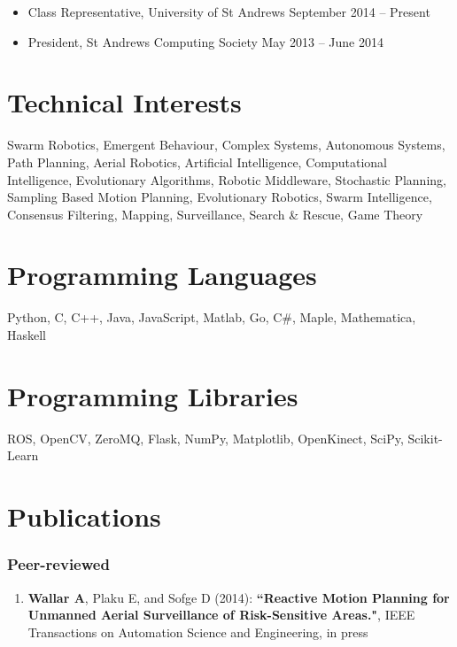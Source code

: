 \documentclass[line,margin]{cv}
\begin{document}
\begin{resume}
\begin{itemize}
    \item Class Representative, University of St Andrews
        \hfill September 2014 -- Present
    \item President, St Andrews Computing Society
        \hfill May 2013 -- June 2014

\end{itemize}

\section{Technical Interests}
    Swarm Robotics, Emergent Behaviour, Complex Systems, Autonomous
    Systems, Path Planning, Aerial Robotics, Artificial Intelligence,
    Computational Intelligence, Evolutionary Algorithms, Robotic Middleware,
    Stochastic Planning, Sampling Based Motion Planning, Evolutionary Robotics,
    Swarm Intelligence, Consensus Filtering, Mapping, Surveillance, Search \&
    Rescue, Game Theory

\section{Programming Languages}
    Python, C, C++, Java, JavaScript, Matlab, Go, C\#, Maple,
    Mathematica, Haskell \\

\section{Programming Libraries}
    ROS, OpenCV, ZeroMQ, Flask, NumPy, Matplotlib, OpenKinect, SciPy,
    Scikit-Learn\\

\section{Publications}

\subsubsection{Peer-reviewed}

\begin{enumerate}

    \item \textbf{Wallar A}, Plaku E, and Sofge D (2014):
        \textbf{``Reactive Motion Planning for Unmanned Aerial Surveillance
        of Risk-Sensitive Areas."}, IEEE Transactions on Automation Science
        and Engineering, in press


\end{enumerate}
\end{resume}
\end{document}
